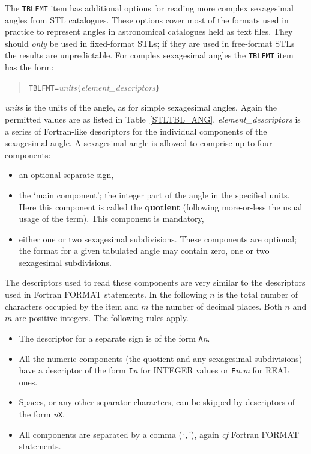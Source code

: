 \documentclass[twoside,11pt]{starlink}
\begin{document}
The \texttt{TBLFMT} item has additional options for reading more complex
sexagesimal angles from STL catalogues.  These options cover most of the
formats used in practice to represent angles in astronomical catalogues
held as text files.  They should \textit{only}\/ be used in fixed-format
STLs; if they are used in free-format STLs the results are
unpredictable.  For complex sexagesimal angles the \texttt{TBLFMT} item
has the form:

\begin{quote}
\texttt{TBLFMT=}\textit{units}\/\texttt{\{}\textit{element\_descriptors}\/\texttt{\}}
\end{quote}

\textit{units}\/ is the units of the angle, as for simple sexagesimal
angles.  Again the permitted values are as listed in
Table~\ref{STLTBL_ANG}.  \textit{element\_descriptors}\/ is a series of
Fortran-like descriptors for the individual components of the
sexagesimal angle.  A sexagesimal angle is allowed to comprise up
to four components:

\begin{itemize}

  \item an optional separate sign,

  \item the `main component'; the integer part of the angle in the
   specified units.  Here this component is called the \textbf{quotient}
   (following more-or-less the usual usage of the term).  This
   component is mandatory,

  \item either one or two sexagesimal subdivisions.  These components
   are optional; the format for a given tabulated angle may contain
   zero, one or two sexagesimal subdivisions.

\end{itemize}

The descriptors used to read these components are very similar to
the descriptors used in Fortran FORMAT statements.  In the following
$n$\/ is the total number of characters occupied by the item and
$m$\/ the number of decimal places.  Both $n$\/ and $m$\/ are
positive integers.  The following rules apply.

\begin{itemize}

  \item The descriptor for a separate sign is of the form
   \texttt{A}\textit{n}.

  \item All the numeric components (the quotient and any sexagesimal
   subdivisions) have a descriptor of the form \texttt{I}\textit{n}\/ for
   INTEGER values or \texttt{F}\textit{n.m}\/ for REAL ones.

  \item Spaces, or any other separator characters, can be skipped by
   descriptors of the form \textit{n}\/\texttt{X}.

  \item All components are separated by a comma (`\texttt{,}'), again
   \textit{cf}\/ Fortran FORMAT statements.

\end{itemize}
\end{document}
